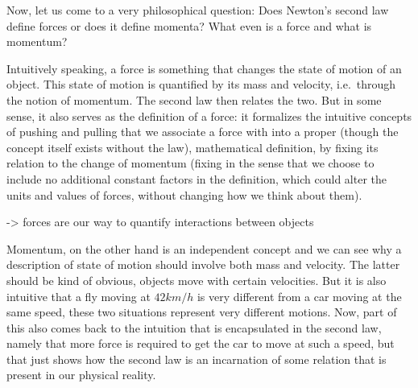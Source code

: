 \documentclass[../class_mech_main.tex]{subfiles}
\begin{document}



Now, let us come to a very philosophical question: Does Newton's second law define forces or does it define momenta? What even is a force and what is momentum?

Intuitively speaking, a force is something that changes the state of motion of an object. This state of motion is quantified by its mass and velocity, i.e.~through the notion of momentum. The second law then relates the two. But in some sense, it also serves as the definition of a force: it formalizes the intuitive concepts of pushing and pulling that we associate a force with into a proper (though the concept itself exists without the law), mathematical definition, by fixing its relation to the change of momentum (fixing in the sense that we choose to include no additional constant factors in the definition, which could alter the units and values of forces, without changing how we think about them).

-> forces are our way to quantify interactions between objects

Momentum, on the other hand is an independent concept and we can see why a description of state of motion should involve both mass and velocity. The latter should be kind of obvious, objects move with certain velocities. But it is also intuitive that a fly moving at $42 km/h$ is very different from a car moving at the same speed, these two situations represent very different motions.
Now, part of this also comes back to the intuition that is encapsulated in the second law, namely that more force is required to get the car to move at such a speed, but that just shows how the second law is an incarnation of some relation that is present in our physical reality. 
\end{document}

